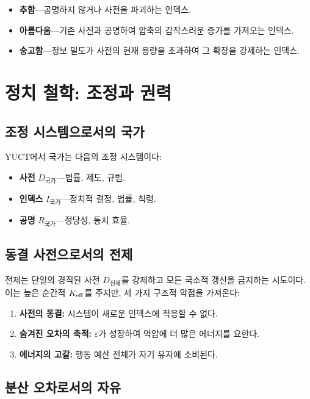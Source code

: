 \documentclass[11pt,a4paper]{article}
\newcommand{\eps}{\varepsilon}
\begin{document}
	\begin{itemize}
		\item \textbf{추함}—공명하지 않거나 사전을 파괴하는 인덱스.
		\item \textbf{아름다움}—기존 사전과 공명하여 압축의 갑작스러운 증가를 가져오는 인덱스.
		\item \textbf{숭고함}—정보 밀도가 사전의 현재 용량을 초과하여 그 확장을 강제하는 인덱스.
	\end{itemize}
	
	\section{정치 철학: 조정과 권력}
	
	\subsection{조정 시스템으로서의 국가}
	
	YUCT에서 국가는 다음의 조정 시스템이다:
	
	\begin{itemize}
		\item \textbf{사전} \(D_{\text{국가}}\)—법률, 제도, 규범.
		\item \textbf{인덱스} \(I_{\text{국가}}\)—정치적 결정, 법률, 칙령.
		\item \textbf{공명} \(R_{\text{국가}}\)—정당성, 통치 효율.
	\end{itemize}
	
	\subsection{동결 사전으로서의 전제}
	
	전제는 단일의 경직된 사전 \(D_{\text{전제}}\)를 강제하고 모든 국소적 갱신을 금지하는 시도이다. 이는 높은 순간적 \(\Keff\)를 주지만, 세 가지 구조적 약점을 가져온다:
	
	\begin{enumerate}
		\item \textbf{사전의 동결:} 시스템이 새로운 인덱스에 적응할 수 없다.
		\item \textbf{숨겨진 오차의 축적:} \(\eps\)가 성장하여 억압에 더 많은 에너지를 요한다.
		\item \textbf{에너지의 고갈:} 행동 예산 전체가 자기 유지에 소비된다.
	\end{enumerate}
	
	\subsection{분산 오차로서의 자유}
	
\end{document}
